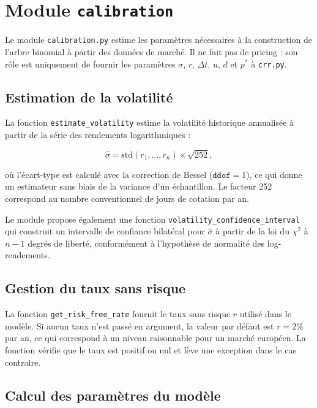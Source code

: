 \documentclass[11pt]{report}
\begin{document}
\section{Module \texttt{calibration}}

Le module \texttt{calibration.py} estime les paramètres nécessaires à la
construction de l'arbre binomial à partir des données de marché.
Il ne fait pas de pricing : son rôle est uniquement de fournir les paramètres
$\sigma$, $r$, $\Delta t$, $u$, $d$ et $p^*$ à \texttt{crr.py}.

\subsection{Estimation de la volatilité}

La fonction \texttt{estimate\_volatility} estime la volatilité historique annualisée
à partir de la série des rendements logarithmiques :

\[
\hat{\sigma} = \text{std}(r_1, \ldots, r_n) \times \sqrt{252},
\]

où l'écart-type est calculé avec la correction de Bessel ($\texttt{ddof} = 1$),
ce qui donne un estimateur sans biais de la variance d'un échantillon.
Le facteur 252 correspond au nombre conventionnel de jours de cotation par an.

Le module propose également une fonction \texttt{volatility\_confidence\_interval}
qui construit un intervalle de confiance bilatéral pour $\hat{\sigma}$ à partir
de la loi du $\chi^2$ à $n-1$ degrés de liberté, conformément à l'hypothèse
de normalité des log-rendements.

\subsection{Gestion du taux sans risque}

La fonction \texttt{get\_risk\_free\_rate} fournit le taux sans risque $r$
utilisé dans le modèle. Si aucun taux n'est passé en argument, la valeur par
défaut est $r = 2\%$ par an, ce qui correspond à un niveau raisonnable pour
un marché européen. La fonction vérifie que le taux est positif ou nul et
lève une exception dans le cas contraire.

\subsection{Calcul des paramètres du modèle}
\end{document}
